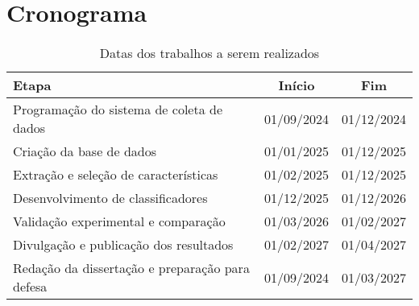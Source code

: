 	\section{Cronograma}
		\label{sec:cronograma}
	
		\begin{table}[h!]
			\centering
			\caption{Datas dos trabalhos a serem realizados}
			\begin{tabular}{|p{10cm}|c|c|}
				\hline
				\textbf{Etapa} & \textbf{Início} & \textbf{Fim} \\
				\hline
				Programação do sistema de coleta de dados & 01/09/2024 & 01/12/2024 \\
				\hline
				Criação da base de dados & 01/01/2025 & 01/12/2025 \\
				\hline
				Extração e seleção de características & 01/02/2025 & 01/12/2025 \\
				\hline
				Desenvolvimento de classificadores & 01/12/2025 & 01/12/2026 \\
				\hline
				Validação experimental e comparação & 01/03/2026 & 01/02/2027 \\
				\hline
				Divulgação e publicação dos resultados & 01/02/2027 & 01/04/2027 \\
				\hline
				Redação da dissertação e preparação para defesa & 01/09/2024 & 01/03/2027 \\
				\hline
			\end{tabular}
			\label{tab:cronograma}
		\end{table}
		
